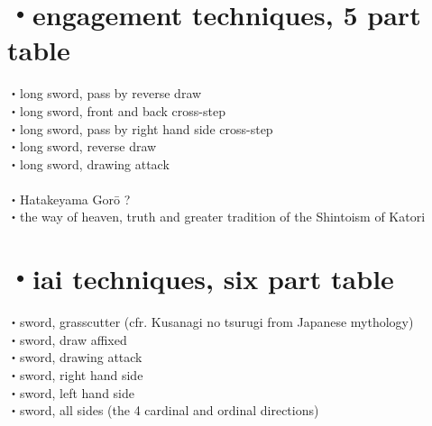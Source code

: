 \documentclass[dvipdfmx, a4paper, 12pt]{utarticle}
\begin{document}
\begin{CJK*}{UTF8}{min}
\begin{landscape}
\section{・engagement techniques, 5 part table}
\noindent {}・long sword, pass by reverse draw\\
・long sword, front and back cross-step\\
・long sword, pass by right hand side cross-step\\
・long sword, reverse draw\\
・long sword, drawing attack\\
\\
・Hatakeyama Gor\={o} ?\\

\setcounter{section}{0}
\newpage
\pagestyle{empty}
・the way of heaven, truth and greater tradition of the Shintoism of Katori\\
\section{・iai techniques, six part table}
\noindent {}・sword, grasscutter (cfr. Kusanagi no tsurugi from Japanese mythology)\\
・sword, draw affixed\\
・sword, drawing attack\\
・sword, right hand side\\
・sword, left hand side\\
・sword, all sides (the 4 cardinal and ordinal directions)\\

\end{landscape}
\end{CJK*}
\end{document}
